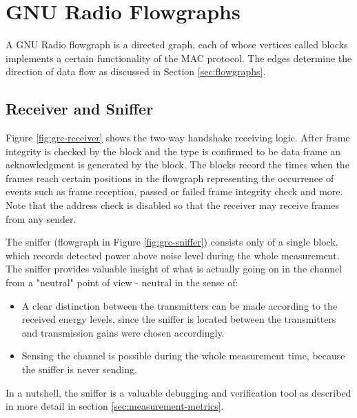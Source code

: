 \section{GNU Radio Flowgraphs}    

A GNU Radio flowgraph is a directed graph, each of whose vertices called blocks implements a certain functionality of the MAC protocol. The edges determine the direction of data flow as discussed in Section \ref{sec:flowgraphs}.

\subsection{Receiver and Sniffer}

Figure \ref{fig:grc-receiver} shows the two-way handshake receiving logic. After frame integrity is checked by the  block and the type is confirmed to be data frame an acknowledgment is generated by the  block. The  blocks record the times when the frames reach certain positions in the flowgraph representing the occurrence of events such as frame reception, passed or failed frame integrity check and more. Note that the address check is disabled so that the receiver may receive frames from any sender.

The sniffer (flowgraph in Figure \ref{fig:grc-sniffer}) consists only of a single  block, which records detected power above noise level during the whole measurement. The sniffer provides valuable insight of what is actually going on in the channel from a "neutral" point of view - neutral in the sense of:

\begin{itemize}
	\item A clear distinction between the transmitters can be made according to the received energy levels, since the sniffer is located between the transmitters and transmission gains were chosen accordingly.
	\item Sensing the channel is possible during the whole measurement time, because the sniffer is never sending.
\end{itemize}

In a nutshell, the sniffer is a valuable debugging and verification tool as described in more detail in section \ref{sec:measurement-metrics}.

